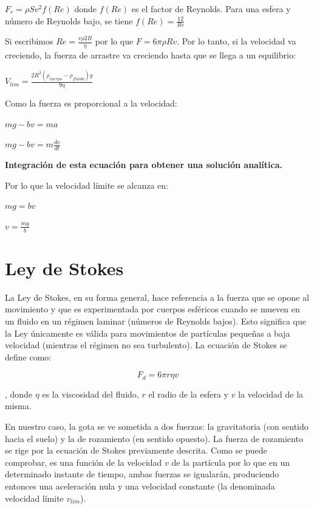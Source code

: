 \documentclass[journal]{IEEEtran}
\begin{document}
$F_r = \rho S v^2 f(Re)$ donde $f(Re)$ es el factor de Reynolds. Para una esfera y número de Reynolds bajo, se tiene $f(Re) = \displaystyle\frac{12}{Re}$

Si escribimos $Re = \displaystyle\frac{v \rho 2 R}{\eta}$ por lo que $F = 6 \pi \rho R v$. Por lo tanto, si la velocidad va creciendo, la fuerza de arrastre va creciendo hasta que se llega a un equilibrio:

$V_{lim} = \displaystyle\frac{2 R^2 (\rho_{cuerpo} - \rho_{fluido}) g}{9 \eta}$

Como la fuerza es proporcional a la velocidad:

$mg - bv = ma$

$mg - bv = m \displaystyle\frac{dv}{dt}$

\textbf{Integración de esta ecuación para obtener una solución analítica.}

Por lo que la velocidad límite se alcanza en:

$mg = bv$

$v = \displaystyle\frac{mg}{b}$

\section{Ley de Stokes}

La Ley de Stokes, en su forma general, hace referencia a la fuerza que se opone al movimiento y que es experimentada por cuerpos esféricos cuando se mueven en un fluido en un régimen laminar (números de Reynolds bajos). Esto significa que la Ley únicamente es válida para movimientos de partículas pequeñas a baja velocidad (mientras el régimen no sea turbulento). La ecuación de Stokes se define como:

\begin{equation}
  F_d = 6 \pi r \eta v
\end{equation}

, donde $\eta$ es la viscosidad del fluido, $r$ el radio de la esfera y $v$ la velocidad de la misma.

En nuestro caso, la gota se ve sometida a dos fuerzas: la gravitatoria (con sentido hacia el suelo) y la de rozamiento (en sentido opuesto). La fuerza de rozamiento se rige por la ecuación de Stokes previamente descrita. Como se puede comprobar, es una función de la velocidad $v$ de la partícula por lo que en un determinado instante de tiempo, ambas fuerzas se igualarán, produciendo entonces una aceleración nula y una velocidad constante (la denominada velocidad límite
$v_{lim}$).
\end{document}
